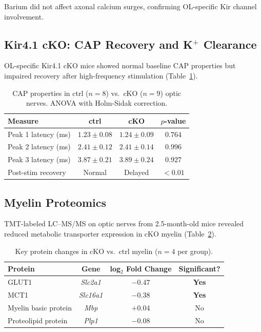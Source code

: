 \documentclass[11pt]{article}
\begin{document}
Barium did not affect axonal calcium surges, confirming OL-specific Kir channel involvement.

\subsection{Kir4.1 cKO: CAP Recovery and K$^+$ Clearance}

OL-specific Kir4.1 cKO mice showed normal baseline CAP properties but impaired recovery after high-frequency stimulation (Table~\ref{tab:cap}).

\begin{table}[H]
\centering
\caption{CAP properties in ctrl ($n = 8$) vs.\ cKO ($n = 9$) optic nerves. ANOVA with Holm-Sidak correction.}
\label{tab:cap}
\begin{tabular}{@{}lccc@{}}
\toprule
Measure & ctrl & cKO & $p$-value \\
\midrule
Peak 1 latency (ms) & $1.23 \pm 0.08$ & $1.24 \pm 0.09$ & $0.764$ \\
Peak 2 latency (ms) & $2.41 \pm 0.12$ & $2.41 \pm 0.14$ & $0.996$ \\
Peak 3 latency (ms) & $3.87 \pm 0.21$ & $3.89 \pm 0.24$ & $0.927$ \\
Post-stim recovery & Normal & Delayed & $\mathbf{< 0.01}$ \\
\bottomrule
\end{tabular}
\end{table}

\subsection{Myelin Proteomics}

TMT-labeled LC--MS/MS on optic nerves from 2.5-month-old mice revealed reduced metabolic transporter expression in cKO myelin (Table~\ref{tab:proteomics}).

\begin{table}[H]
\centering
\caption{Key protein changes in cKO vs.\ ctrl myelin ($n = 4$ per group).}
\label{tab:proteomics}
\begin{tabular}{@{}lccc@{}}
\toprule
Protein & Gene & log$_2$ Fold Change & Significant? \\
\midrule
GLUT1 & \textit{Slc2a1} & $-0.47$ & \textbf{Yes} \\
MCT1 & \textit{Slc16a1} & $-0.38$ & \textbf{Yes} \\
Myelin basic protein & \textit{Mbp} & $+0.04$ & No \\
Proteolipid protein & \textit{Plp1} & $-0.08$ & No \\
\bottomrule
\end{tabular}
\end{table}
\end{document}
